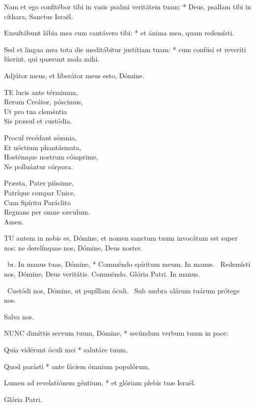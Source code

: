 Nam et ego confitébor tibi in vasis psalmi veritátem tuam: * Deus, psallam tibi in cíthara, Sanctus Israël.

Exsultábunt lábia mea cum cantávero tibi: * et ánima mea, quam redemísti.

Sed et lingua mea tota die meditábitur justítiam tuam: * cum confúsi et reveríti fúerint, qui quærunt mala mihi.

 Adjútor meus, et liberátor meus esto, Dómine.


\lettrine[lines=2]{T}{E} lucis ante términum,\\
Rerum Creátor, póscimus,\\
Ut pro tua cleméntia\\
Sis præsul et custódia.

Procul recédant sómnia,\\
Et nóctium phantásmata,\\
Hostémque nostrum cómprime,\\
Ne polluántur córpora.

Præsta, Pater piíssime,\\
Patríque compar Unice,\\
Cum Spíritu Paráclito\\
Regnans per omne sæculum.\\
Amen.


\lettrine[lines=2]{T}{U} autem in nobis es, Dómine, et nomen sanctum tuum invocátum est super nos: ne derelínquas nos, Dómine, Deus noster.

\R\ br. In manus tuas, Dómine, * Comméndo spíritum meum. In manus. \V\ Redemísti nos, Dómine, Deus veritátis. Comméndo. Glória Patri. In manus.

\V\ Custódi nos, Dómine, ut pupíllam óculi. \R\ Sub umbra alárum tuárum prótege nos.

 Salva nos.


\lettrine[lines=2]{N}{UNC} dimíttis servum tuum, Dómine, * secúndum verbum tuum in pace:

Quia vidérunt óculi mei * salutáre tuum,

Quod parásti * ante fáciem ómnium populórum,

Lumen ad revelatiónem géntium, * et glóriam plebis tuæ Israël.

Glória Patri.

